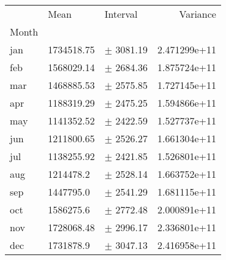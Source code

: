 \begin{tabular}{lllr}
\toprule
{} &        Mean &        Interval &      Variance \\
Month &             &                 &               \\
\midrule
jan   &  1734518.75 &   $\pm$ 3081.19 &  2.471299e+11 \\
feb   &  1568029.14 &   $\pm$ 2684.36 &  1.875724e+11 \\
mar   &  1468885.53 &   $\pm$ 2575.85 &  1.727145e+11 \\
apr   &  1188319.29 &   $\pm$ 2475.25 &  1.594866e+11 \\
may   &  1141352.52 &   $\pm$ 2422.59 &  1.527737e+11 \\
jun   &  1211800.65 &   $\pm$ 2526.27 &  1.661304e+11 \\
jul   &  1138255.92 &   $\pm$ 2421.85 &  1.526801e+11 \\
aug   &   1214478.2 &   $\pm$ 2528.14 &  1.663752e+11 \\
sep   &   1447795.0 &   $\pm$ 2541.29 &  1.681115e+11 \\
oct   &   1586275.6 &   $\pm$ 2772.48 &  2.000891e+11 \\
nov   &  1728068.48 &   $\pm$ 2996.17 &  2.336801e+11 \\
dec   &   1731878.9 &   $\pm$ 3047.13 &  2.416958e+11 \\
\bottomrule
\end{tabular}
